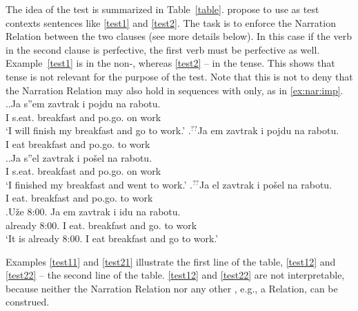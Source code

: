 The idea of the test is summarized in Table~\ref{table}. \citet{ZinovaFilip:13} propose to use as test contexts sentences like \ref{test1} and \ref{test2}. The task is to enforce the Narration Relation  between the two clauses (see more details below). In this case if the verb in the second clause is perfective, the first verb must be perfective as well. Example~\ref{test1} is in the non-, whereas \ref{test2} -- in the  tense. This shows that tense is not relevant for the purpose of the test. Note that this is not to deny that the Narration Relation may also hold in sequences with  only, as in \ref{ex:nar:imp}.
\ex.\label{test1}\ag.\label{test11}Ja s''em\textsuperscript{\PF} zavtrak i pojdu\textsuperscript{\PF} na rabotu.\\
I s.eat. breakfast and po.go. on work\\
\trans `I will finish my breakfast and go to work.'
\bg.\label{test12}$^{??}$Ja em\textsuperscript{\IPF} zavtrak i pojdu\textsuperscript{\PF} na rabotu.\\ 
I eat breakfast and po.go. to work\\

\ex.\label{test2}\ag.\label{test21}Ja s''el\textsuperscript{\PF} zavtrak i po\v{s}el\textsuperscript{\PF} na rabotu.\\
I s.eat. breakfast and po.go. on work\\
\trans `I finished my breakfast and went to work.'
\bg.\label{test22}$^{??}$Ja el\textsuperscript{\IPF} zavtrak i po\v{s}el\textsuperscript{\PF} na rabotu.\\
I eat. breakfast and po.go. to work\\

\exg.\label{ex:nar:imp}U\v{z}e 8:00. Ja em\textsuperscript{\IPF} zavtrak i idu\textsuperscript{\IPF} na rabotu.\\
already 8:00. I eat. breakfast and go. to work\\
\trans `It is already 8:00. I eat breakfast and go to work.'

Examples \ref{test11} and \ref{test21} illustrate the first line of the table, \ref{test12} and \ref{test22} -- the second line of the table. \ref{test12} and \ref{test22} are not interpretable, because neither the Narration Relation nor any other , e.g., a  Relation, can be construed. 

